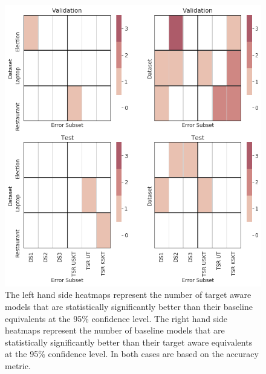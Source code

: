 \begin{figure}[!h]
    \centering
    \includegraphics[scale=0.4]{images/augmentation/methods_performance/Inter_Target/inter_target_split_dataset_heatmaps.png}
    \caption{The left hand side heatmaps represent the number of target aware models that are statistically significantly better than their baseline equivalents at the 95\% confidence level. The right hand side heatmaps represent the number of baseline models that are statistically significantly better than their target aware equivalents at the 95\% confidence level. In both cases are based on the accuracy metric.}
    \label{fig:aug_inter_target_split_dataset_heatmaps}
\end{figure}
